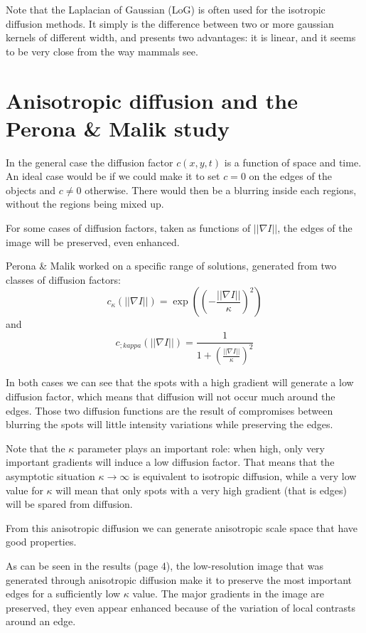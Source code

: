 \documentclass[12pt,a4paper]{article}
\begin{document}
Note that the Laplacian of Gaussian (LoG) is often used for the isotropic diffusion methods. It simply is the difference between two or more gaussian kernels of different width, and presents two advantages: it is linear, and it seems to be very close from the way mammals see.

\section{Anisotropic diffusion and the Perona \& Malik study}

In the general case the diffusion factor $c(x,y,t)$ is a function of space and time.
An ideal case would be if we could make it to set $c=0$ on the edges of the objects and $c \neq 0$ otherwise. There would then be a blurring inside each regions, without the regions being mixed up.

For some cases of diffusion factors, taken as functions of $|| \nabla I ||$, the edges of the image will be preserved, even enhanced.

Perona \& Malik worked on a specific range of solutions, generated from two classes of diffusion factors:
\begin{equation}
	c_{\kappa}(||\nabla I||) = \exp((-\frac{||\nabla I||}{\kappa})^{2})
\end{equation}
and
\begin{equation}
c_{;kappa}(||\nabla I||) = \frac{1}{1+(\frac{|| \nabla I ||}{\kappa})^{2}}
\end{equation}

In both cases we can see that the spots with a high gradient will generate a low diffusion factor, which means that diffusion will not occur much around the edges. Those two diffusion functions are the result of compromises between blurring the spots will little intensity variations while preserving the edges.

Note that the $\kappa$ parameter plays an important role: when high, only very important gradients will induce a low diffusion factor. That means that the asymptotic situation $\kappa \to \infty$ is equivalent to isotropic diffusion, while a very low value for $\kappa$ will mean that only spots with a very high gradient (that is edges) will be spared from diffusion.

From this anisotropic diffusion we can generate anisotropic scale space that have good properties.

As can be seen in the results (page 4), the low-resolution image that was generated through anisotropic diffusion make it to preserve the most important edges for a sufficiently low $\kappa$ value. The major gradients in the image are preserved, they even appear enhanced because of the variation of local contrasts around an edge.
\end{document}
